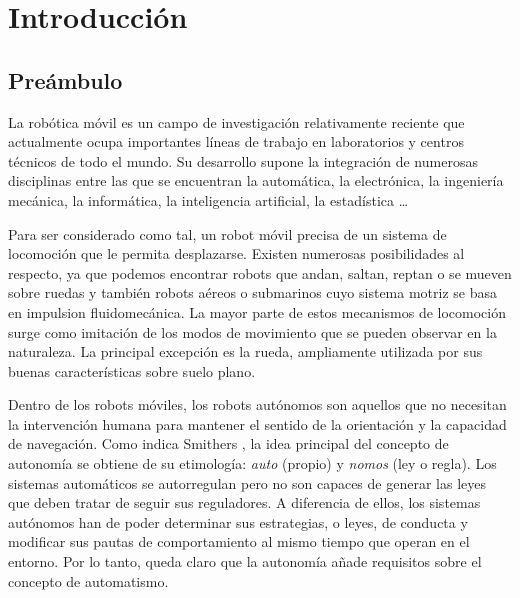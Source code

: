 \chapter{Introducción}\label{ch:introduccion}
\section{Preámbulo}

La robótica móvil es un campo de investigación relativamente reciente que actualmente ocupa importantes líneas de trabajo en laboratorios y centros técnicos de todo el mundo. Su desarrollo supone la integración de numerosas disciplinas entre las que se encuentran la automática, la electrónica, la ingeniería mecánica, la informática, la inteligencia artificial, la estadística \ldots

Para ser considerado como tal, un robot móvil precisa de un sistema de locomoción que le permita desplazarse. Existen numerosas posibilidades al respecto, ya que podemos encontrar robots que andan, saltan, reptan o se mueven sobre ruedas y también robots aéreos o submarinos cuyo sistema motriz se basa en impulsion fluidomecánica. La mayor parte de estos mecanismos de locomoción surge como imitación de los modos de movimiento que se pueden observar en la naturaleza. La principal excepción es la rueda, ampliamente utilizada por sus buenas características sobre suelo plano.

Dentro de los robots móviles, los robots autónomos son aquellos que no necesitan la intervención humana para mantener el sentido de la orientación y la capacidad de navegación. Como indica Smithers \cite{Smithers92}, la idea principal del concepto de autonomía se obtiene de su etimología: \emph{auto} (propio) y \emph{nomos} (ley o regla). Los sistemas automáticos se autorregulan pero no son capaces de generar las leyes que deben tratar de seguir sus reguladores. A diferencia de ellos, los sistemas autónomos han de poder determinar sus estrategias, o leyes, de conducta y modificar sus pautas de comportamiento al mismo tiempo que operan en el entorno. Por lo tanto, queda claro que la autonomía añade requisitos sobre el concepto de automatismo.

